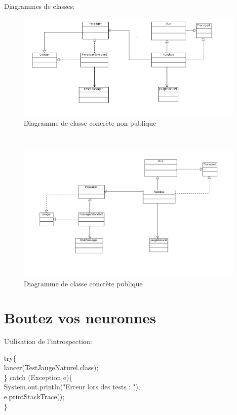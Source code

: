 \documentclass[a4paper,11pt]{article}
\begin{document}
Diagrammes de classes:
\begin{figure}[h]
   \caption{Diagramme de classe concrète non publique}
   \includegraphics[scale=0.9]{nonPublique.png}
\end{figure} \\

\begin{figure}[!h]
   \caption{Diagramme de classe concrète publique}
   \includegraphics[scale=0.9]{Publique.png}
\end{figure}

\newpage
\section{Boutez vos neuronnes}

Utilisation de l'introspection:

\noindent try\{ \\
  \indent lancer(TestJaugeNaturel.class); \\
\} catch (Exception e)\{ \\
  \indent System.out.println("Erreur lors des tests : "); \\
  \indent e.printStackTrace(); \\
\}
\end{document}
